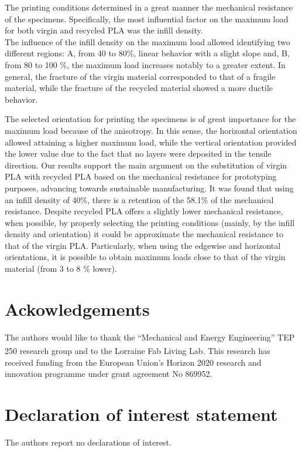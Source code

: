 \documentclass[]{interact}
\theoremstyle{plain}%
\theoremstyle{definition}
\theoremstyle{remark}
\begin{document}
The printing conditions determined in a great manner the mechanical
resistance of the specimens. Specifically, the most influential factor
on the maximum load for both virgin and recycled PLA was the infill
density.\\
The influence of the infill density on the maximum load allowed
identifying two different regions: A, from 40 to 80\%, linear behavior
with a slight slope and, B, from 80 to 100 \%, the maximum load
increases notably to a greater extent. In general, the fracture of the
virgin material corresponded to that of a fragile material, while the
fracture of the recycled material showed a more ductile behavior.

The selected orientation for printing the specimens is of great
importance for the maximum load because of the anisotropy. In this
sense, the horizontal orientation allowed attaining a higher maximum
load, while the vertical orientation provided the lower value due to the
fact that no layers were deposited in the tensile direction. Our results
support the main argument on the substitution of virgin PLA with
recycled PLA based on the mechanical resistance for prototyping
purposes, advancing towards sustainable manufacturing. It was found that
using an infill density of 40\%, there is a retention of the 58.1\% of
the mechanical resistance. Despite recycled PLA offers a slightly lower
mechanical resistance, when possible, by properly selecting the printing
conditions (mainly, by the infill density and orientation) it could be
approximate the mechanical resistance to that of the virgin PLA.
Particularly, when using the edgewise and horizontal orientations, it is
possible to obtain maximum loads close to that of the virgin material
(from 3 to 8 \% lower).

\hypertarget{ackowledgements}{%
\section{Ackowledgements}\label{ackowledgements}}

The authors would like to thank the ``Mechanical and Energy
Engineering'' TEP 250 research group and to the Lorraine Fab Living
Lab\textsuperscript{\textregistered}. This research has received funding
from the European Union's Horizon 2020 research and innovation programme
under grant agreement No 869952.

\hypertarget{declaration-of-interest-statement}{%
\section{Declaration of interest
statement}\label{declaration-of-interest-statement}}

The authors report no declarations of interest.



\end{document}
